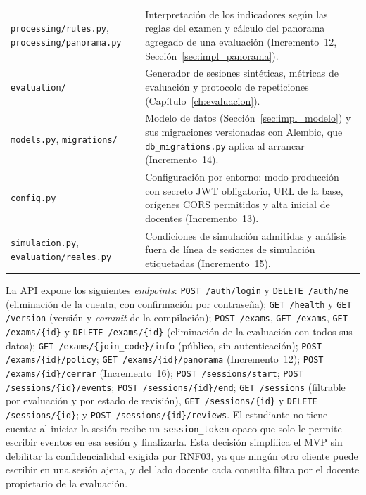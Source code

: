 {\begin{longtable}{>{\raggedright\arraybackslash}p{4.9cm} >{\raggedright\arraybackslash}p{10.1cm}}
        \texttt{processing/rules.py}, \texttt{processing/panorama.py} & Interpretación de los indicadores según las reglas del examen y cálculo del panorama agregado de una evaluación (Incremento~12, Sección~\ref{sec:impl_panorama}). \\
        \texttt{evaluation/} & Generador de sesiones sintéticas, métricas de evaluación y protocolo de repeticiones (Capítulo~\ref{ch:evaluacion}). \\
        \texttt{models.py}, \texttt{migrations/} & Modelo de datos (Sección~\ref{sec:impl_modelo}) y sus migraciones versionadas con Alembic, que \texttt{db\_migrations.py} aplica al arrancar (Incremento~14). \\
        \texttt{config.py} & Configuración por entorno: modo producción con secreto JWT obligatorio, URL de la base, orígenes CORS permitidos y alta inicial de docentes (Incremento~13). \\
        \texttt{simulacion.py}, \texttt{evaluation/reales.py} & Condiciones de simulación admitidas y análisis fuera de línea de sesiones de simulación etiquetadas (Incremento~15). \\
        \end{longtable}
}

La API expone los siguientes \textit{endpoints}: \texttt{POST /auth/login} y \texttt{DELETE /auth/me} (eliminación de la cuenta, con confirmación por contraseña); \texttt{GET /health} y \texttt{GET /version} (versión y \textit{commit} de la compilación); \texttt{POST /exams}, \texttt{GET /exams}, \texttt{GET /exams/\{id\}} y \texttt{DELETE /exams/\{id\}} (eliminación de la evaluación con todos sus datos); \texttt{GET /exams/\{join\_code\}/info} (público, sin autenticación); \texttt{POST /exams/\{id\}/policy}; \texttt{GET /exams/\{id\}/panorama} (Incremento~12); \texttt{POST /exams/\{id\}/cerrar} (Incremento~16); \texttt{POST /sessions/start}; \texttt{POST /sessions/\{id\}/events}; \texttt{POST /sessions/\{id\}/end}; \texttt{GET /sessions} (filtrable por evaluación y por estado de revisión), \texttt{GET /sessions/\{id\}} y \texttt{DELETE /sessions/\{id\}}; y \texttt{POST /sessions/\{id\}/reviews}. El estudiante no tiene cuenta: al iniciar la sesión recibe un \texttt{session\_token} opaco que solo le permite escribir eventos en esa sesión y finalizarla. Esta decisión simplifica el MVP sin debilitar la confidencialidad exigida por RNF03, ya que ningún otro cliente puede escribir en una sesión ajena, y del lado docente cada consulta filtra por el docente propietario de la evaluación.

